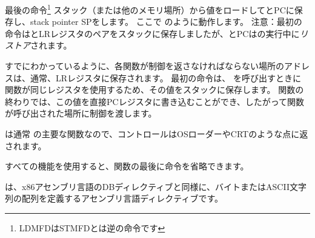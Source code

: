 最後の命令\footnote{\ac{LDMFD}は\ac{STMFD}とは逆の命令です}
スタック（または他のメモリ場所）から値をロードしてと\ac{PC}に保存し、\gls{stack pointer} \ac{SP}をします。
ここで \POP のように動作します。
注意：最初の命令はと\ac{LR}レジスタのペアをスタックに保存しましたが、と\ac{PC}はの実行中に\emph{リストア}されます。

すでにわかっているように、各関数が制御を返さなければならない場所のアドレスは、通常、\ac{LR}レジスタに保存されます。
最初の命令は、 \printf を呼び出すときに \main 関数が同じレジスタを使用するため、その値をスタックに保存します。
関数の終わりでは、この値を直接\ac{PC}レジスタに書き込むことができ、したがって関数が呼び出された場所に制御を渡します。

\main は通常 \CCpp の主要な関数なので、コントロールは\ac{OS}ローダーや\ac{CRT}のような点に返されます。

すべての機能を使用すると、関数の最後に命令を省略できます。

は、x86アセンブリ言語のDBディレクティブと同様に、バイトまたはASCII文字列の配列を定義するアセンブリ言語ディレクティブです。
